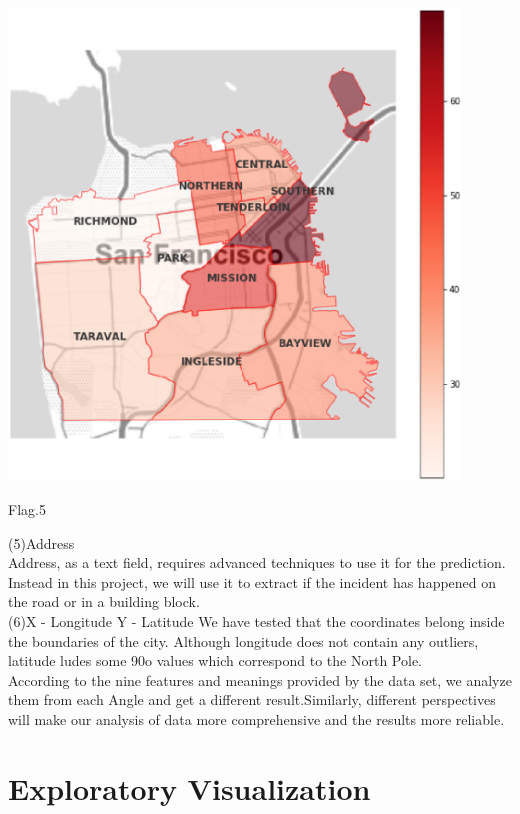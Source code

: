 \begin{center}
  \begin{minipage}{0.4\linewidth}
  \centering

  \includegraphics[width=0.9\textwidth]{kaggle/10.eps}
 
  {\small{Flag.5}}

  \end{minipage}
  \hfill
\end{center}
(5)Address
\\
Address, as a text field, requires advanced techniques to use it for
 the prediction. Instead in this project, we will use it to extract
  if the incident has happened on the road or in a building block.
\\
(6)X - Longitude Y - Latitude
We have tested that the coordinates belong inside the boundaries of 
the city. Although longitude does not contain any outliers, latitude 
ludes some 90o values which correspond to the North Pole.
\\

\indent According to the nine features and meanings provided by the data set, we 
analyze them from each Angle and get a different result.Similarly, different 
perspectives will make our analysis
 of data more comprehensive and the results more reliable.

\section{Exploratory Visualization} 


